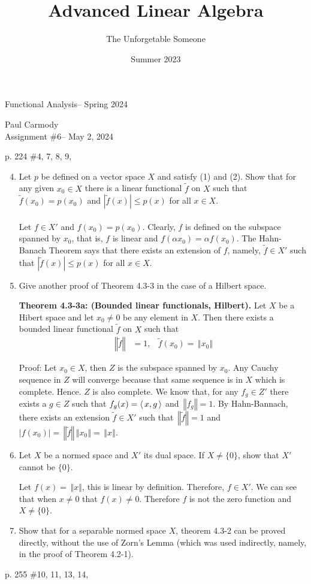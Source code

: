 \documentclass[10pt,a4paper]{report}
\title{Advanced Linear Algebra}
\author{The Unforgetable Someone}
\date{Summer 2023}
\newcommand{\CLASSNAME}{Functional Analysis}
\newcommand{\STUDENTNAME}{Paul Carmody}
\newcommand{\ASSIGNMENT}{Assignment \#6}
\newcommand{\DUEDATE}{May 2, 2024}
\newcommand{\SEMESTER}{Spring 2024}
\newcommand{\NORM}[1]{\,\left \Vert #1 \right \Vert}
\begin{document}
\begin{center}
	\Large{\CLASSNAME -- \SEMESTER} \\
\end{center}
\begin{center}
	\STUDENTNAME \\
	\ASSIGNMENT -- \DUEDATE\\
\end{center} 


p. 224 \#4, 7, 8, 9, 

\begin{enumerate}
	\setcounter{enumi}{3}
	\item Let $p$ be defined on a vector space $X$ and satisfy (1) and (2). Show that for any given $x_0 \in X$ there is a linear functional $\tilde{f}$ on $X$ such that $\tilde{f}(x_0)=p(x_0)$ and $|\tilde{f}(x)| \le p(x)$ for all $x \in X$.\\
	\\
	Let $f \in X'$ and $f(x_0)=p(x_0)$.  Clearly, $f$ is defined on the subspace spanned by $x_0$, that is, $f$ is linear and $f(\alpha x_0)=\alpha f(x_0)$.  The Hahn-Banach Theorem says that there exists an extension of $f$, namely, $\tilde{f} \in X'$ such that $|\tilde{f}(x)| \le p(x)$ for all $x \in X$.
	
	\setcounter{enumi}{6}
	\item Give another proof of Theorem 4.3-3 in the case of a Hilbert space.
	
	\textbf{Theorem 4.3-3a: (Bounded linear functionals, Hilbert).}  Let $X$ be a Hibert space and let $x_0\ne 0$ be any element in $X$.  Then there exists a bounded linear functional $\tilde{f}$ on $X$ such that 
	\begin{align*}
	\NORM{\tilde{f}} &= 1, &\tilde{f}(x_0)= \NORM{x_0}
	\end{align*}
	
	Proof: Let $x_0 \in X$, then $Z$ is the subspace spanned by $x_0$. Any Cauchy sequence in $Z$ will converge because that same sequence is in $X$ which is complete.  Hence. $Z$ is also complete.  We know that, for any $f_g \in Z'$ there exists a $g \in Z$ such that $f_g(x) = \left \langle\, x,g \,\right \rangle$ and $\NORM{f_g} = 1$.  By Hahn-Bannach, there exists an extension $\tilde{f} \in X'$ such that $\NORM{\tilde{f}} = 1$ and $|f(x_0)| = \NORM{\tilde{f}} \NORM{x_0} = \NORM{x}$.
	
	\item Let $X$ be a normed space and $X'$ its dual space. If $X \ne \{0\}$, show that $X'$ cannot be $\{0\}$.
	
	Let $f(x) = \NORM{x}$, this is linear by definition. Therefore, $f \in X'$.  We can see that when $x \ne 0$ that $f(x) \ne 0$. Therefore $f$ is not the zero function and $X \ne \{ 0 \}$.
	
	\item Show that for a separable normed space $X$, theorem 4.3-2 can be proved directly, without the use of Zorn's Lemma (which was used indirectly, namely, in the proof of Theorem 4.2-1).
	
\end{enumerate}
\newpage
p. 255 \#10, 11, 13, 14,
\end{document}
